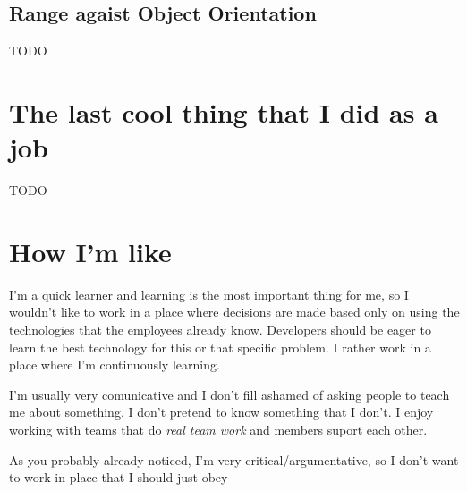 \documentclass[11pt,a4paper,sans]{moderncv}
\begin{document}
\subsection{Range agaist Object Orientation}
TODO

\section{The last cool thing that I did as a job}
TODO

\section{How I'm like}
I'm a quick learner and learning is the most important thing for me,
so I wouldn't like to work in a place where decisions are made based
only on using the technologies that the employees already
know. Developers should be eager to learn the best technology for this or that
specific problem. I rather work in a place where I'm continuously learning.

I'm usually very comunicative and I don't fill ashamed of asking people
to teach me about something. I don't pretend to know something that I don't.
I enjoy working with teams that do \textit{real team work} and members
suport each other. 

As you probably already noticed, I'm very critical/argumentative, so
I don't want to work in place that I should just obey 
\end{document}
